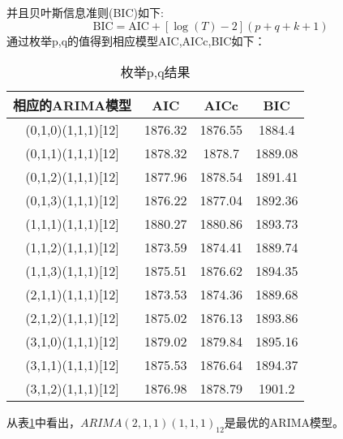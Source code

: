\documentclass[12pt,a4paper]{nmmcm}
\begin{document}
  并且贝叶斯信息准则(BIC)如下:\[\text{BIC} = \text{AIC} + [\log(T)-2](p+q+k+1)\]
  通过枚举p,q的值得到相应模型AIC,AICc,BIC如下：
\begin{table}[htbp]
  \centering
  \caption{枚举p,q结果}
    \begin{tabular}{c|ccc}
    相应的ARIMA模型 & AIC   & AICc  & BIC \\
    \hline
    (0,1,0)(1,1,1)[12] & 1876.32 & 1876.55 & 1884.4 \\
    (0,1,1)(1,1,1)[12] & 1878.32 & 1878.7 & 1889.08 \\
    (0,1,2)(1,1,1)[12] & 1877.96 & 1878.54 & 1891.41 \\
    (0,1,3)(1,1,1)[12]  & 1876.22 & 1877.04 & 1892.36 \\
    (1,1,1)(1,1,1)[12] & 1880.27 & 1880.86 & 1893.73 \\
    (1,1,2)(1,1,1)[12] & 1873.59 & 1874.41 & 1889.74 \\
    (1,1,3)(1,1,1)[12] & 1875.51 & 1876.62 & 1894.35 \\
    (2,1,1)(1,1,1)[12] & 1873.53 & 1874.36 & 1889.68 \\
    (2,1,2)(1,1,1)[12] & 1875.02 & 1876.13 & 1893.86 \\
    (3,1,0)(1,1,1)[12] & 1879.02 & 1879.84 & 1895.16 \\
    (3,1,1)(1,1,1)[12] & 1875.53 & 1876.64 & 1894.37 \\
    (3,1,2)(1,1,1)[12] & 1876.98 & 1878.79 & 1901.2 \\
    \end{tabular}%
  \label{choose optimal models}%
\end{table}%

  从表\ref{choose optimal models}中看出，\(ARIMA(2,1,1)(1,1,1)_{12}\)是最优的ARIMA模型。
\end{document}
